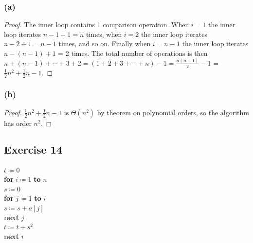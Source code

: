 \documentclass[14pt]{extarticle}
\begin{document}
\subsubsection{(a)}
\begin{proof}
    The inner loop contains 1 comparison operation. When \(i = 1\) the inner loop iterates \(n-1+1 = n\) times, when \(i = 2\)
    the inner loop iterates \(n-2+1 = n-1\) times, and so on. Finally when \(i = n-1\) the inner loop iterates \(n-(n-1)+1\)
    = 2 times. The total number of operations is then \(n+(n-1)+ \cdots + 3 + 2 = (1+2+3+ \cdots + n)-1 = \frac{n(n+1)}{2}-1\)
    = \(\frac{1}{2}n^2 + \frac{1}{2}n - 1\).
\end{proof}

\subsubsection{(b)}
\begin{proof}
    \(\frac{1}{2}n^2 + \frac{1}{2}n - 1\) is \(\Theta(n^2)\) by theorem on polynomial orders, so the algorithm has order
    \(n^2\).
\end{proof}

\subsection{Exercise 14}
\begin{tabbing}
    \(t \coloneqq 0\) \\
    {\bf for} \= \(i \coloneqq 1\) {\bf to} \(n\) \\
    \> \(s \coloneqq 0\) \\
    \> {\bf for} \= \(j \coloneqq 1\) {\bf to} \(i\)\\
    \>           \> \(s \coloneqq s + a[j]\) \\
    \> {\bf next} \(j\) \\
    \> \(t \coloneqq t + s^2\) \\
    {\bf next} \(i\)
\end{tabbing}
\end{document}
